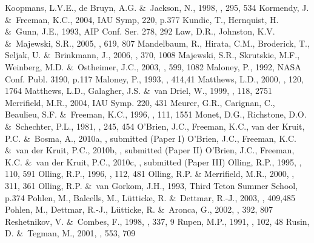 \documentclass[traditabstract]{aa} %
\begin{document}
\begin{thebibliography}{}
Koopmans, L.V.E., de Bruyn, A.G. \&\ Jackson, N., 1998, \mnras, 295, 534
Kormendy, J. \&\ Freeman, K.C., 2004, IAU Symp, 220, p.377
Kundic, T., Hernquist, H. \&\ Gunn, J.E., 1993, AIP Conf. Ser. 278, 292
Law, D.R., Johnston, K.V. \&\ Majewski, S.R., 2005, \apj, 619, 807
Mandelbaum, R., Hirata, C.M., Broderick, T., Seljak, U. \&\ Brinkmann, J.,
2006, \mnras, 370, 1008 
Majewski, S.R., Skrutskie, M.F., Weinberg, M.D. \&\ Ostheimer, J.C., 2003,
\apj, 599, 1082
Maloney, P., 1992, NASA Conf. Publ. 3190, p.117
Maloney, P., 1993, \apj, 414,41
Matthews, L.D., 2000, \aj, 120, 1764
Matthews, L.D., Galagher, J.S. \&\ van Driel, W., 1999, \aj, 118, 2751
Merrifield, M.R., 2004, IAU Symp. 220, 431
Meurer, G.R., Carignan, C., Beaulieu, S.F. \&\ Freeman, K.C., 1996, 
\aj, 111, 1551 
Monet, D.G., Richstone, D.O. \&\ Schechter, P.L., 1981, \apj, 245, 454
O'Brien, J.C.,  Freeman, K.C., van der Kruit, P.C. \&\ Bosma, A., 
2010a, \aap, submitted (Paper I)
O'Brien, J.C., Freeman, K.C. \&\ van der Kruit, P.C., 2010b, 
\aap, submitted (Paper II)
O'Brien, J.C., Freeman, K.C. \&\ van der Kruit, P.C., 2010c, 
\aap, submitted (Paper III) 
Olling, R.P., 1995, \aj, 110, 591
Olling, R.P., 1996, \aj, 112, 481
Olling, R.P. \& Merrifield, M.R., 2000, \mnras, 311, 361
Olling, R.P. \&\ van Gorkom, J.H., 1993, Third Teton Summer School, p.374 
Pohlen, M., Balcells, M., L\"utticke, R. \&\ Dettmar, R.-J., 2003, \aap,
409,485
Pohlen, M., Dettmar, R.-J., L\"utticke, R. \&\ Aronca, G., 2002, \aap, 
392, 807
Reshetnikov, V. \&\ Combes, F., 1998, \aap, 337, 9
Rupen, M.P., 1991, \aj, 102, 48
Rusin, D. \&\ Tegman, M., 2001, \apj, 553, 709

\end{thebibliography}
\end{document}
